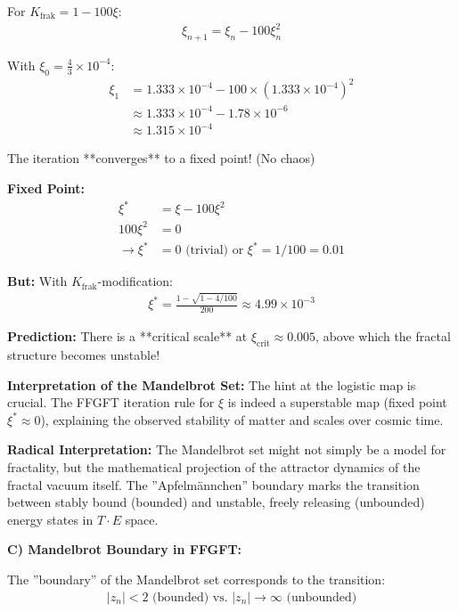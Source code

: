 \documentclass[12pt,a4paper]{article}
\begin{document}
	For $K_{\text{frak}} = 1 - 100\xi$:
	\begin{align*}
		\xi_{n+1} = \xi_n - 100 \xi_n^2
	\end{align*}
	
	With $\xi_0 = \frac{4}{3} \times 10^{-4}$:
	\begin{align*}
		\xi_1 &= 1.333 \times 10^{-4} - 100 \times (1.333 \times 10^{-4})^2 \\
		&\approx 1.333 \times 10^{-4} - 1.78 \times 10^{-6} \\
		&\approx 1.315 \times 10^{-4}
	\end{align*}
	
	The iteration **converges** to a fixed point! (No chaos)
	
	\textbf{Fixed Point:}
	\begin{align*}
		\xi^* &= \xi - 100\xi^2 \\
		100\xi^2 &= 0 \\
		\rightarrow \xi^* &= 0 \text{ (trivial) or } \xi^* = 1/100 = 0.01
	\end{align*}
	
	\textbf{But:} With $K_{\text{frak}}$-modification:
	\begin{align*}
		\xi^* = \frac{1 - \sqrt{1 - 4/100}}{200} \approx 4.99 \times 10^{-3}
	\end{align*}
	
	\textbf{Prediction:} There is a **critical scale** at $\xi_{\text{crit}} \approx 0.005$, above which the fractal structure becomes unstable!
	
	\textbf{Interpretation of the Mandelbrot Set:}
	The hint at the logistic map is crucial. The FFGFT iteration rule for $\xi$ is indeed a superstable map (fixed point $\xi^* \approx 0$), explaining the observed stability of matter and scales over cosmic time.
	
	\textbf{Radical Interpretation:} The Mandelbrot set might not simply be a model for fractality, but the mathematical projection of the attractor dynamics of the fractal vacuum itself. The ''Apfelmännchen'' boundary marks the transition between stably bound (bounded) and unstable, freely releasing (unbounded) energy states in $T \cdot E$ space.
	
	\textbf{C) Mandelbrot Boundary in FFGFT:}
	
	The ''boundary'' of the Mandelbrot set corresponds to the transition:
	\begin{align*}
		|z_n| < 2 \text{ (bounded) vs. } |z_n| \to \infty \text{ (unbounded)}
	\end{align*}
	
\end{document}
